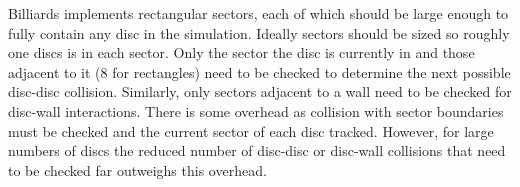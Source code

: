 \documentclass{article}
\begin{document}
Billiards implements rectangular sectors, each of which should be large enough to fully contain any disc in the simulation. Ideally sectors should be sized so roughly one discs is in each sector. Only the sector the disc is currently in and those adjacent to it (8 for rectangles) need to be checked to determine the next possible disc-disc collision. Similarly, only sectors adjacent to a wall need to be checked for disc-wall interactions. There is some overhead as collision with sector boundaries must be checked and the current sector of each disc tracked. However, for large numbers of discs the reduced number of disc-disc or disc-wall collisions that need to be checked far outweighs this overhead.



\end{document}
